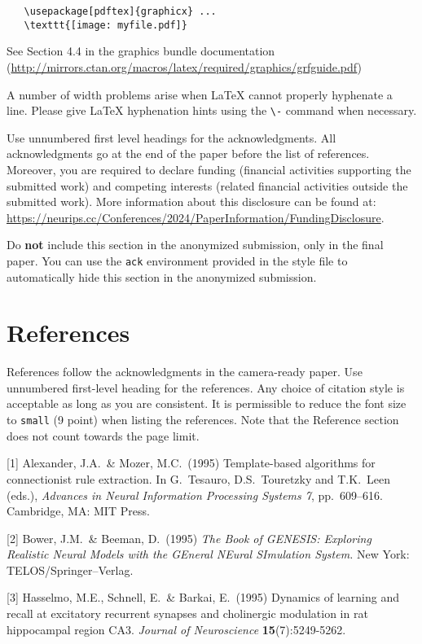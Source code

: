 \documentclass{article}
\begin{document}
\begin{verbatim}
   \usepackage[pdftex]{graphicx} ...
   \texttt{[image: myfile.pdf]}
\end{verbatim}

See Section 4.4 in the graphics bundle documentation (\url{http://mirrors.ctan.org/macros/latex/required/graphics/grfguide.pdf})

A number of width problems arise when \LaTeX{} cannot properly hyphenate a line. Please give LaTeX hyphenation hints using the \verb+\-+ command when necessary.

\begin{ack}
    Use unnumbered first level headings for the acknowledgments. All acknowledgments go at the end of the paper before the list of references. Moreover, you are required to declare funding (financial activities supporting the submitted work) and competing interests (related financial activities outside the submitted work). More information about this disclosure can be found at: \url{https://neurips.cc/Conferences/2024/PaperInformation/FundingDisclosure}.

    Do {\bf not} include this section in the anonymized submission, only in the final paper. You can use the \texttt{ack} environment provided in the style file to automatically hide this section in the anonymized submission.
\end{ack}

\section*{References}

References follow the acknowledgments in the camera-ready paper. Use unnumbered first-level heading for the references. Any choice of citation style is acceptable as long as you are consistent. It is permissible to reduce the font size to \verb+small+ (9 point) when listing the references. Note that the Reference section does not count towards the page limit.

\medskip
{\small

[1] Alexander, J.A.\ \& Mozer, M.C.\ (1995) Template-based algorithms for connectionist rule extraction. In G.\ Tesauro, D.S.\ Touretzky and T.K.\ Leen (eds.), {\it Advances in Neural Information Processing Systems 7}, pp.\ 609--616. Cambridge, MA: MIT Press.

[2] Bower, J.M.\ \& Beeman, D.\ (1995) {\it The Book of GENESIS: Exploring Realistic Neural Models with the GEneral NEural SImulation System.} New York: TELOS/Springer--Verlag.

[3] Hasselmo, M.E., Schnell, E.\ \& Barkai, E.\ (1995) Dynamics of learning and recall at excitatory recurrent synapses and cholinergic modulation in rat hippocampal region CA3. {\it Journal of Neuroscience} {\bf 15}(7):5249-5262.
}
\end{document}
